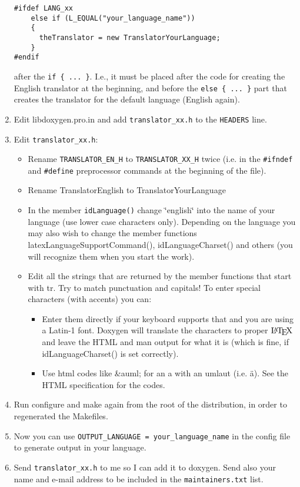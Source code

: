 \begin{enumerate}
\footnotesize\begin{verbatim}
#ifdef LANG_xx
    else if (L_EQUAL("your_language_name"))
    {
      theTranslator = new TranslatorYourLanguage;
    }
#endif    
\end{verbatim}
\normalsize
 after the {\tt if \{ ... \}}. I.e., it must be placed after the code for creating the English translator at the beginning, and before the {\tt else \{ ... \}} part that creates the translator for the default language (English again). \item Edit libdoxygen.pro.in and add {\tt translator\_\-xx.h} to the {\tt HEADERS} line. \item Edit {\tt translator\_\-xx.h}: \begin{itemize}
\item Rename {\tt TRANSLATOR\_\-EN\_\-H} to {\tt TRANSLATOR\_\-XX\_\-H} twice (i.e. in the {\tt \#ifndef} and {\tt \#define} preprocessor commands at the beginning of the file). \item Rename TranslatorEnglish to TranslatorYourLanguage \item In the member {\tt idLanguage()} change \char`\"{}english\char`\"{} into the name of your language (use lower case characters only). Depending on the language you may also wish to change the member functions latexLanguageSupportCommand(), idLanguageCharset() and others (you will recognize them when you start the work). \item Edit all the strings that are returned by the member functions that start with tr. Try to match punctuation and capitals! To enter special characters (with accents) you can: \begin{itemize}
\item Enter them directly if your keyboard supports that and you are using a Latin-1 font. Doxygen will translate the characters to proper $\mbox{\LaTeX}$ and leave the HTML and man output for what it is (which is fine, if idLanguageCharset() is set correctly). \item Use html codes like \&auml; for an a with an umlaut (i.e. \"{a}). See the HTML specification for the codes. \end{itemize}
\end{itemize}
\item Run configure and make again from the root of the distribution, in order to regenerated the Makefiles. \item Now you can use {\tt OUTPUT\_\-LANGUAGE = your\_\-language\_\-name} in the config file to generate output in your language. \item Send {\tt translator\_\-xx.h} to me so I can add it to doxygen. Send also your name and e-mail address to be included in the {\tt maintainers.txt} list. \end{enumerate}



